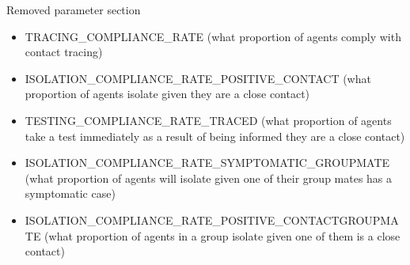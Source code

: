 \documentclass{article}
\begin{document}
Removed parameter section
\begin{itemize}
\item TRACING\_COMPLIANCE\_RATE (what proportion of agents comply with contact tracing)
\item ISOLATION\_COMPLIANCE\_RATE\_POSITIVE\_CONTACT (what proportion of agents isolate given they are a close contact) 

\item TESTING\_COMPLIANCE\_RATE\_TRACED (what proportion of agents take a test immediately as a result of being informed they are a close contact)


\item ISOLATION\_COMPLIANCE\_RATE\_SYMPTOMATIC\_GROUPMATE (what proportion of agents will isolate given one of their group mates has a symptomatic case)

\item ISOLATION\_COMPLIANCE\_RATE\_POSITIVE\_CONTACTGROUPMATE (what proportion of agents in a group isolate given one of them is a close contact)
\end{itemize}
\end{document}
